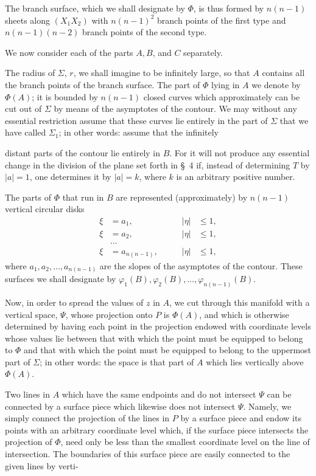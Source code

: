 \documentclass{article}
\begin{document}
The branch surface, which we shall designate by $\Phi$, is thus formed by $n(n - 1)$ sheets along $(X_1 X_2)$ with $n(n - 1)^2$ branch points of the first type and $n(n - 1)(n - 2)$ branch points of the second type.

We now consider each of the parts $A, B$, and $C$ separately.

The radius of $\Sigma$, $r$, we shall imagine to be infinitely large, so that $A$ contains all the branch points of the branch surface. The part of $\Phi$ lying in $A$ we denote by $\Phi(A)$; it is bounded by $n(n - 1)$ closed curves which approximately can be cut out of $\Sigma$ by means of the asymptotes of the contour. We may without any essential restriction assume that these curves lie entirely in the part of $\Sigma$ that we have called $\Sigma_1$; in other words: assume that the infinitely

distant parts of the contour lie entirely in $B$. For it will not produce any essential change in the division of the plane set forth in §~4 if, instead of determining $T$ by $|a| = 1$, one determines it by $|a| = k$, where $k$ is an arbitrary positive number.

The parts of $\Phi$ that run in $B$ are represented (approximately) by $n(n - 1)$ vertical circular disks
\[
\begin{aligned}
\xi &= a_1, \qquad &|\eta| &\le 1, \\
\xi &= a_2, \qquad &|\eta| &\le 1, \\
&\dots \\
\xi &= a_{n(n-1)}, \qquad &|\eta| &\le 1,
\end{aligned}
\]
where $a_1, a_2, \dots, a_{n(n-1)}$ are the slopes of the asymptotes of the contour. These surfaces we shall designate by $\varphi_1(B), \varphi_2(B), \dots, \varphi_{n(n-1)}(B)$.

Now, in order to spread the values of $z$ in $A$, we cut through this manifold with a vertical space, $\Psi$, whose projection onto $P$ is $\Phi(A)$, and which is otherwise determined by having each point in the projection endowed with coordinate levels whose values lie between that with which the point must be equipped to belong to $\Phi$ and that with which the point must be equipped to belong to the uppermost part of $\Sigma$; in other words: the space is that part of $A$ which lies vertically above $\Phi(A)$.

Two lines in $A$ which have the same endpoints and do not intersect $\Psi$ can be connected by a surface piece which likewise does not intersect $\Psi$. Namely, we simply connect the projection of the lines in $P$ by a surface piece and endow its points with an arbitrary coordinate level which, if the surface piece intersects the projection of $\Phi$, need only be less than the smallest coordinate level on the line of intersection. The boundaries of this surface piece are easily connected to the given lines by verti-
\end{document}
